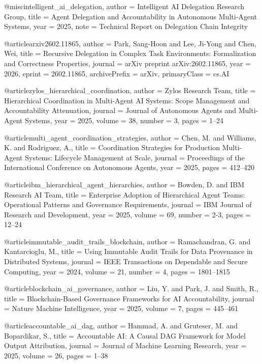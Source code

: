 @misc{intelligent_ai_delegation,
  author = {Intelligent AI Delegation Research Group},
  title = {Agent Delegation and Accountability in Autonomous Multi-Agent Systems},
  year = {2025},
  note = {Technical Report on Delegation Chain Integrity}
}

@article{arxiv2602.11865,
  author = {Park, Sang-Hoon and Lee, Ji-Yong and Chen, Wei},
  title = {Recursive Delegation in Complex Task Environments: Formalization and Correctness Properties},
  journal = {arXiv preprint arXiv:2602.11865},
  year = {2026},
  eprint = {2602.11865},
  archivePrefix = {arXiv},
  primaryClass = {cs.AI}
}

@article{zylos_hierarchical_coordination,
  author = {Zylos Research Team},
  title = {Hierarchical Coordination in Multi-Agent AI Systems: Scope Management and Accountability Attenuation},
  journal = {Journal of Autonomous Agents and Multi-Agent Systems},
  year = {2025},
  volume = {38},
  number = {3},
  pages = {1--24}
}

@article{multi_agent_coordination_strategies,
  author = {Chen, M. and Williams, K. and Rodriguez, A.},
  title = {Coordination Strategies for Production Multi-Agent Systems: Lifecycle Management at Scale},
  journal = {Proceedings of the International Conference on Autonomous Agents},
  year = {2025},
  pages = {412--420}
}

@article{ibm_hierarchical_agent_hierarchies,
  author = {Bowden, D. and IBM Research AI Team},
  title = {Enterprise Adoption of Hierarchical Agent Teams: Operational Patterns and Governance Requirements},
  journal = {IBM Journal of Research and Development},
  year = {2025},
  volume = {69},
  number = {2-3},
  pages = {12--24}
}

@article{immutable_audit_trails_blockchain,
  author = {Ramachandran, G. and Kantarcioglu, M.},
  title = {Using Immutable Audit Trails for Data Provenance in Distributed Systems},
  journal = {IEEE Transactions on Dependable and Secure Computing},
  year = {2024},
  volume = {21},
  number = {4},
  pages = {1801--1815}
}

@article{blockchain_ai_governance,
  author = {Liu, Y. and Park, J. and Smith, R.},
  title = {Blockchain-Based Governance Frameworks for AI Accountability},
  journal = {Nature Machine Intelligence},
  year = {2025},
  volume = {7},
  pages = {445--461}
}

@article{accountable_ai_dag,
  author = {Hammad, A. and Gruteser, M. and Bopardikar, S.},
  title = {Accountable AI: A Causal DAG Framework for Model Output Attribution},
  journal = {Journal of Machine Learning Research},
  year = {2025},
  volume = {26},
  pages = {1--38}
}

